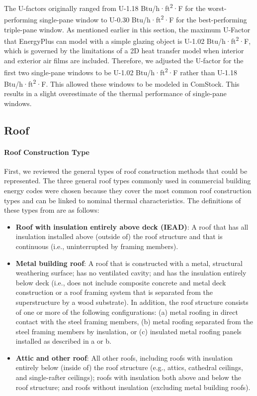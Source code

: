 The U-factors originally ranged from U-1.18 Btu/h·ft\textsuperscript{2}·F for the worst-performing single-pane window to U-0.30 Btu/h·ft\textsuperscript{2}·F for the best-performing triple-pane window. As mentioned earlier in this section, the maximum U-Factor that EnergyPlus can model with a simple glazing object is U-1.02 Btu/h·ft\textsuperscript{2}·F, which is governed by the limitations of a 2D heat transfer model when interior and exterior air films are included. Therefore, we adjusted the U-factor for the first two single-pane windows to be U-1.02 Btu/h·ft\textsuperscript{2}·F rather than U-1.18 Btu/h·ft\textsuperscript{2}·F. This allowed these windows to be modeled in ComStock. This results in a slight overestimate of the thermal performance of single-pane windows.


\subsection{Roof} %
\paragraph{Roof Construction Type}
First, we reviewed the general types of roof construction methods that could be represented. The three general roof types commonly used in commercial building energy codes were chosen because they cover the most common roof construction types and can be linked to nominal thermal characteristics. The definitions of these types from \cite{ashrae_901_2010} are as follows:

\begin{itemize}
\item \textbf{Roof with insulation entirely above deck (IEAD)}: A roof that has all insulation installed above (outside of) the roof structure and that is continuous (i.e., uninterrupted by framing members).
\item \textbf{Metal building roof}: A roof that is constructed with a metal, structural weathering surface; has no ventilated cavity; and has the insulation entirely below deck (i.e., does not include composite concrete and metal deck construction or a roof framing system that is separated from the superstructure by a wood substrate). In addition, the roof structure consists of one or
more of the following configurations: (a) metal roofing in direct contact with the steel framing members, (b) metal roofing separated from the steel framing members by insulation, or (c) insulated metal roofing panels installed as described in a or b.
\item \textbf{Attic and other roof}: All other roofs, including roofs with insulation entirely below (inside of) the roof structure (e.g., attics, cathedral ceilings, and single-rafter ceilings); roofs with insulation both above and below the roof structure; and roofs without insulation (excluding metal building roofs).
\end{itemize}

